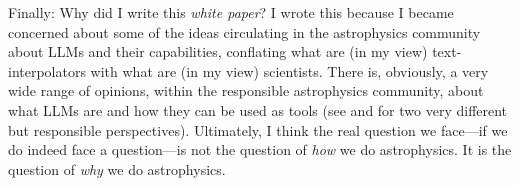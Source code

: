 \documentclass{article}
\newcommand{\documentname}{\textsl{white paper}}
\begin{document}
Finally: Why did I write this \documentname?
I wrote this because I became concerned about some of the ideas circulating in the astrophysics community about LLMs and their capabilities, conflating what are (in my view) text-interpolators with what are (in my view) scientists.
There is, obviously, a very wide range of opinions, within the responsible astrophysics community, about what LLMs are and how they can be used as tools (see \cite{ting} and \cite{trotta} for two very different but responsible perspectives).
Ultimately, I think the real question we face---if we do indeed face a question---is not the question of \emph{how} we do astrophysics.
It is the question of \emph{why} we do astrophysics.


\end{document}
